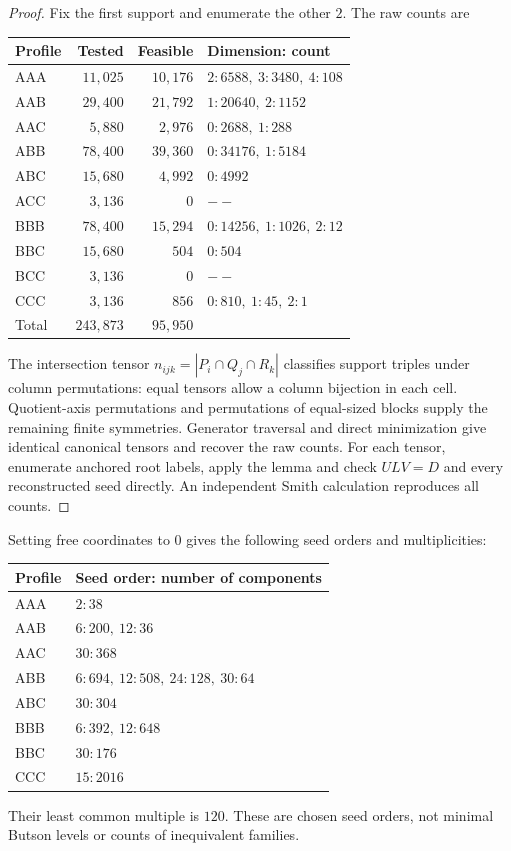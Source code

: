 \documentclass[11pt,a4paper]{article}
\theoremstyle{plain}
\theoremstyle{definition}
\numberwithin{equation}{section}
\begin{document}
\begin{proof}
Fix the first support and enumerate the other $2$. The raw counts are
\begin{center}\small \begin{tabular}{lrrl}\toprule Profile & Tested & Feasible & Dimension: count\\\midrule
AAA&$11{,}025$&$10{,}176$&$2:6588,\ 3:3480,\ 4:108$\\
AAB&$29{,}400$&$21{,}792$&$1:20640,\ 2:1152$\\
AAC&$5{,}880$&$2{,}976$&$0:2688,\ 1:288$\\
ABB&$78{,}400$&$39{,}360$&$0:34176,\ 1:5184$\\
ABC&$15{,}680$&$4{,}992$&$0:4992$\\
ACC&$3{,}136$&$0$&$--$\\
BBB&$78{,}400$&$15{,}294$&$0:14256,\ 1:1026,\ 2:12$\\
BBC&$15{,}680$&$504$&$0:504$\\
BCC&$3{,}136$&$0$&$--$\\
CCC&$3{,}136$&$856$&$0:810,\ 1:45,\ 2:1$\\
\midrule Total&$243{,}873$&$95{,}950$&\\\bottomrule\end{tabular}\end{center}
The intersection tensor $n_{ijk}=|P_i\cap Q_j\cap R_k|$ classifies support triples under column permutations: equal tensors allow a column bijection in each cell. Quotient-axis permutations and permutations of equal-sized blocks supply the remaining finite symmetries. Generator traversal and direct minimization give identical canonical tensors and recover the raw counts. For each tensor, enumerate anchored root labels, apply the lemma and check $ULV=D$ and every reconstructed seed directly. An independent Smith calculation reproduces all counts.
\end{proof}
Setting free coordinates to $0$ gives the following seed orders and multiplicities:
\begin{center}\begin{tabular}{ll}\toprule
Profile&Seed order: number of components\\\midrule
AAA&$2:38$\\
AAB&$6:200,\ 12:36$\\
AAC&$30:368$\\
ABB&$6:694,\ 12:508,\ 24:128,\ 30:64$\\
ABC&$30:304$\\
BBB&$6:392,\ 12:648$\\
BBC&$30:176$\\
CCC&$15:2016$\\\bottomrule
\end{tabular}\end{center}
Their least common multiple is $120$. These are chosen seed orders, not minimal Butson levels or counts of inequivalent families.
\end{document}
